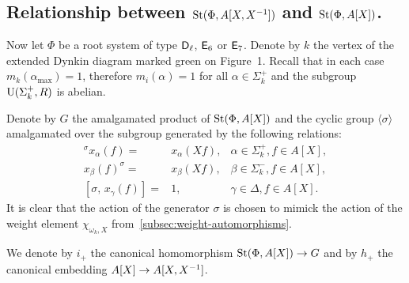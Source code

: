 \subsection{Relationship between $\operatorname{St}(\Phi, A[X, X^{-1}])$ and $\operatorname{St}(\Phi, A[X])$.} \label{subsec:short-presentation}
Now let $\Phi$ be a root system of type $\mathsf{D}_\ell$, $\mathsf{E}_6$ or $\mathsf{E}_7$.
Denote by $k$ the vertex of the extended Dynkin diagram marked green on Figure~1.
Recall that in each case $m_k(\alpha_\mathrm{\max}) = 1$, therefore $m_i(\alpha) = 1$ for all $\alpha \in \Sigma_k^+$ and the subgroup $\operatorname{U}(\Sigma^+_k, R)$ is abelian.

Denote by $G$ the amalgamated product of $\operatorname{St}(\Phi, A[X])$ and the cyclic group $\langle \sigma \rangle$ amalgamated over the subgroup generated by the following relations:
\begin{align}
    {}^\sigma x_{\alpha}(f) = & x_{\alpha} (Xf), & \alpha \in \Sigma^+_k, f \in A[X], \label{eq:sigma-sigma-plus} \\
    x_{\beta}(f)^ \sigma     =& x_{\beta} (Xf), & \beta \in \Sigma^-_k, f \in A[X], \label{eq:sigma-sigma-minus} \\
    [\sigma,\, x_\gamma(f)]   =& 1, & \gamma \in \Delta, f \in A[X]. \label{eq:sigma-delta}
\end{align}
It is clear that the action of the generator $\sigma$ is chosen to mimick the action of the weight element $\chi_{\omega_k, X}$ from~\cref{subsec:weight-automorphisms}.

We denote by $i_+$ the canonical homomorphism $\operatorname{St}(\Phi, A[X]) \to G$ and by $h_+$ the canonical embedding $A[X] \to A[X, X^{-1}]$.


